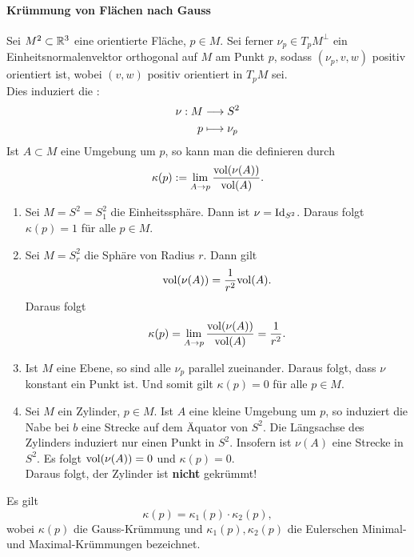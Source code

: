 
\paragraph{Krümmung von Flächen nach Gauss}
Sei $M^2 \subset \mathbb{R}^3$ eine orientierte Fläche, $p\in M$. Sei ferner $\nu_p \in T_pM^\bot$ ein Einheitsnormalenvektor orthogonal auf $M$ am Punkt $p$, sodass $(\nu_p, v, w)$ positiv orientiert ist, wobei $(v,w)$ positiv orientiert in $T_pM$ sei.\\
Dies induziert die :
\begin{align*}
\nu: M &\overset{}{\longrightarrow} S^2\\
p &\longmapsto \nu_p
\end{align*}
Ist $A \subset M$ eine Umgebung um $p$, so kann man die  definieren durch
\begin{align*}
\kappa(p) := \lim\limits_{A\overset{}{\rightarrow} p} \frac{\mathrm{vol}(\nu(A))}{\mathrm{vol}(A)}.
\end{align*}

\Bsp{}
\begin{enumerate}[1.)]
	\item Sei $M = S^2 = S^2_1$ die Einheitssphäre. Dann ist $\nu = \text{Id}_{S^2}$. Daraus folgt $\kappa(p) = 1$ für alle $p \in M$.
	\item Sei $M = S^2_r$ die Sphäre von Radius $r$. Dann gilt
	\[ \mathrm{vol}(\nu(A)) = \frac{1}{r^2}\mathrm{vol}(A). \]
	Daraus folgt
	\[ \kappa(p) = \lim\limits_{A\overset{}{\rightarrow} p} \frac{\mathrm{vol}(\nu(A))}{\mathrm{vol}(A)} = \frac{1}{r^2}. \]
	\item Ist $M$ eine Ebene, so sind alle $\nu_p$ parallel zueinander. Daraus folgt, dass $\nu$ konstant ein Punkt ist. Und somit gilt $\kappa(p) = 0$ für alle $p\in M$.
	\item Sei $M$ ein Zylinder, $p \in M$. Ist $A$ eine kleine Umgebung um $p$, so induziert die Nabe bei $b$ eine Strecke auf dem Äquator von $S^2$. Die Längsachse des Zylinders induziert nur einen Punkt in $S^2$. Insofern ist $\nu(A)$ eine Strecke in $S^2$. Es folgt $\mathrm{vol}(\nu(A)) = 0$ und $\kappa(p) = 0$.\\
	Daraus folgt, der Zylinder ist \textbf{nicht} gekrümmt!
\end{enumerate}

Es gilt
\[ \kappa(p) = \kappa_1(p) \cdot \kappa_2(p),\]
wobei $\kappa(p)$ die Gauss-Krümmung und $\kappa_1(p), \kappa_2(p)$ die Eulerschen Minimal- und Maximal-Krümmungen bezeichnet.

